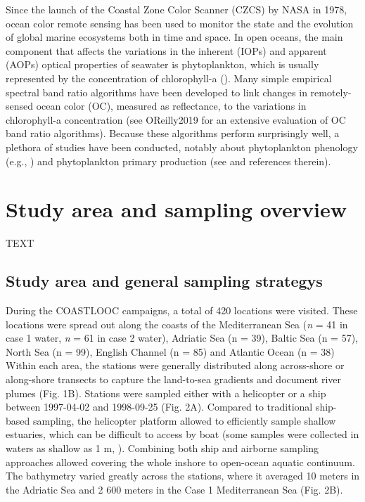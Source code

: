 \documentclass[essd, manuscript]{copernicus}
\begin{document}


\introduction  %

Since the launch of the Coastal Zone Color Scanner (CZCS) by NASA in 1978, ocean color remote sensing has been used to monitor the state and the evolution of global marine ecosystems both in time and space. In open oceans, the main component that affects the variations in the inherent (IOPs) and apparent (AOPs) optical properties of seawater is phytoplankton, which is usually represented by the concentration of chlorophyll-a (\citep{Morel1977}). Many simple empirical spectral band ratio algorithms have been developed to link changes in remotely-sensed ocean color (OC), measured as reflectance, to the variations in chlorophyll-a concentration (see OReilly2019 for an extensive evaluation of OC band ratio algorithms). Because these algorithms perform surprisingly well, a plethora of studies have been conducted, notably about phytoplankton phenology (e.g., \citealt{Vargas2009}) and phytoplankton primary production (see \citealt{Carr2006} and references therein).

\section{Study area and sampling overview}
TEXT


\subsection{Study area and general sampling strategys}

During the COASTLOOC campaigns, a total of 420 locations were visited. These locations were spread out along the coasts of the Mediterranean Sea (\textit{n} = 41 in case 1 water, \textit{n} = 61 in case 2 water), Adriatic Sea (n = 39), Baltic Sea (n = 57), North Sea (n = 99), English Channel (n = 85) and Atlantic Ocean (n = 38) Within each area, the stations were generally distributed along across-shore or along-shore transects to capture the land-to-sea gradients and document river plumes (Fig. 1B). Stations were sampled either with a helicopter or a ship between 1997-04-02 and 1998-09-25 (Fig. 2A). Compared to traditional ship-based sampling, the helicopter platform allowed to efficiently sample shallow estuaries, which can be difficult to access by boat (some samples were collected in waters as shallow as 1 m, \citealt{Babin2003}). Combining both ship and airborne sampling approaches allowed covering the whole inshore to open-ocean aquatic continuum. The bathymetry \citep{GEBCO2020} varied greatly across the stations, where it averaged 10 meters in the Adriatic Sea and 2 600 meters in the Case 1 Mediterranean Sea (Fig. 2B).
\end{document}
